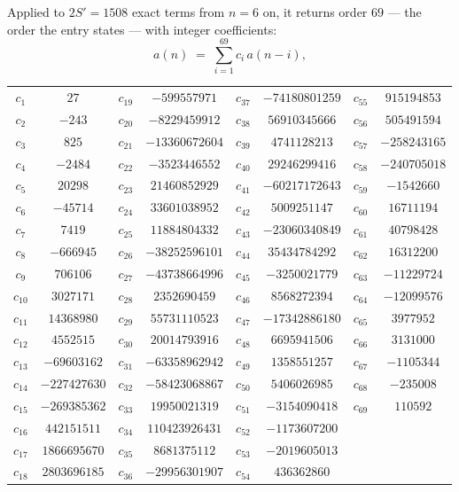 \documentclass[11pt,a4paper]{article}
\theoremstyle{plain}
\theoremstyle{definition}
\begin{document}
Applied to $2S'=1508$ exact terms from $n=6$ on, it returns order $69$ --- the
order the entry states --- with integer coefficients:
\[
a(n)\;=\;\sum_{i=1}^{69}c_i\,a(n-i),
\]
\begin{center}\small
\begin{tabular}{cccccccc}
$c_{1}$ & $27$ & $c_{19}$ & $-599557971$ & $c_{37}$ & $-74180801259$ & $c_{55}$ & $915194853$ \\
$c_{2}$ & $-243$ & $c_{20}$ & $-8229459912$ & $c_{38}$ & $56910345666$ & $c_{56}$ & $505491594$ \\
$c_{3}$ & $825$ & $c_{21}$ & $-13360672604$ & $c_{39}$ & $4741128213$ & $c_{57}$ & $-258243165$ \\
$c_{4}$ & $-2484$ & $c_{22}$ & $-3523446552$ & $c_{40}$ & $29246299416$ & $c_{58}$ & $-240705018$ \\
$c_{5}$ & $20298$ & $c_{23}$ & $21460852929$ & $c_{41}$ & $-60217172643$ & $c_{59}$ & $-1542660$ \\
$c_{6}$ & $-45714$ & $c_{24}$ & $33601038952$ & $c_{42}$ & $5009251147$ & $c_{60}$ & $16711194$ \\
$c_{7}$ & $7419$ & $c_{25}$ & $11884804332$ & $c_{43}$ & $-23060340849$ & $c_{61}$ & $40798428$ \\
$c_{8}$ & $-666945$ & $c_{26}$ & $-38252596101$ & $c_{44}$ & $35434784292$ & $c_{62}$ & $16312200$ \\
$c_{9}$ & $706106$ & $c_{27}$ & $-43738664996$ & $c_{45}$ & $-3250021779$ & $c_{63}$ & $-11229724$ \\
$c_{10}$ & $3027171$ & $c_{28}$ & $2352690459$ & $c_{46}$ & $8568272394$ & $c_{64}$ & $-12099576$ \\
$c_{11}$ & $14368980$ & $c_{29}$ & $55731110523$ & $c_{47}$ & $-17342886180$ & $c_{65}$ & $3977952$ \\
$c_{12}$ & $4552515$ & $c_{30}$ & $20014793916$ & $c_{48}$ & $6695941506$ & $c_{66}$ & $3131000$ \\
$c_{13}$ & $-69603162$ & $c_{31}$ & $-63358962942$ & $c_{49}$ & $1358551257$ & $c_{67}$ & $-1105344$ \\
$c_{14}$ & $-227427630$ & $c_{32}$ & $-58423068867$ & $c_{50}$ & $5406026985$ & $c_{68}$ & $-235008$ \\
$c_{15}$ & $-269385362$ & $c_{33}$ & $19950021319$ & $c_{51}$ & $-3154090418$ & $c_{69}$ & $110592$ \\
$c_{16}$ & $442151511$ & $c_{34}$ & $110423926431$ & $c_{52}$ & $-1173607200$ &  &  \\
$c_{17}$ & $1866695670$ & $c_{35}$ & $8681375112$ & $c_{53}$ & $-2019605013$ &  &  \\
$c_{18}$ & $2803696185$ & $c_{36}$ & $-29956301907$ & $c_{54}$ & $436362860$ &  &  \\
\end{tabular}
\end{center}
\end{document}
